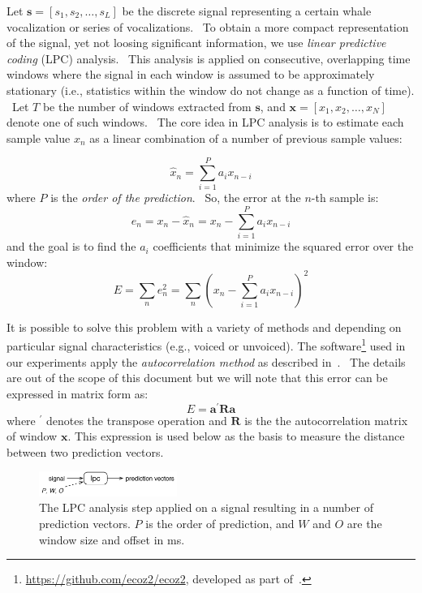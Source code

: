 \documentclass[letterpaper,12pt]{article}
\newcommand{\ba}{\ensuremath{\mathbf{a}}}
\newcommand{\bs}{\ensuremath{\mathbf{s}}}
\newcommand{\bx}{\ensuremath{\mathbf{x}}}
\newcommand{\bR}{\ensuremath{\mathbf{R}}}
\begin{document}
    Let $\bs = [ s_1, s_2, \ldots, s_L ]$
    be the discrete signal representing a certain whale vocalization or
    series of vocalizations.
    \
    To obtain a more compact representation of the signal, yet not loosing
    significant information,
    we use \textit{linear predictive coding} (LPC) analysis.
    \
    This analysis is applied on consecutive, overlapping time windows where
    the signal in each window is assumed to be approximately stationary
    (i.e., statistics within the window do not change as a function of time).
    \
    Let $T$ be the number of windows extracted from $\bs$,
    and $\bx = [ x_1, x_2, \ldots, x_N ]$ denote one of such windows.
    \
    The core idea in LPC analysis is to estimate each sample value $x_n$
    as a linear combination of a number of previous sample values:

    \[
        \hat{x}_n = \sum\limits_{i=1}^{P} a_i x_{n-i}
    \]
    where $P$ is the \textit{order of the prediction}.
    \
    So, the  error at the $n$-th sample is:
    \[
        e_n = x_n - \hat{x}_n
            = x_n - \sum\limits_{i=1}^{P} a_i x_{n-i}
    \]
    and the goal is to find the $a_i$ coefficients that minimize the
    squared error over the window:
    \[
        E = \sum\limits_n e^2_n
          = \sum\limits_n ( x_n - \sum\limits_{i=1}^{P} a_i x_{n-i} )^2
    \]

    It is possible to solve this problem with a variety of methods and
    depending on particular signal characteristics (e.g., voiced or unvoiced).
    The software\footnote{
        \url{https://github.com/ecoz2/ecoz2},
        developed as part of~\citep{Rueda:1993}.
    }
    used in our experiments apply the \textit{autocorrelation method}
    as described in~\citep{Parsons:87}.
    \
    The details are out of the scope of this document but we will note that
    this error can be expressed in matrix form as:
    \
    \begin{equation}
        E = \ba^\prime \bR \ba  \label{eq-E-quadratic}
    \end{equation}
    where $^\prime$ denotes the transpose operation and
    $\bR$ is the the autocorrelation matrix of window $\bx$.
    This expression is used below as the basis to measure the
    distance between two prediction vectors.

	\begin{figure}[!ht]
		\centering
		\includegraphics[width=0.4\textwidth]{lpc.pdf}
		\caption{
		The LPC analysis step applied on a signal resulting in a number of prediction vectors.
        $P$ is the order of prediction, and $W$ and $O$ are the window size and offset in ms.
		}
		\label{fig:lpc-step}
	\end{figure}
\end{document}
